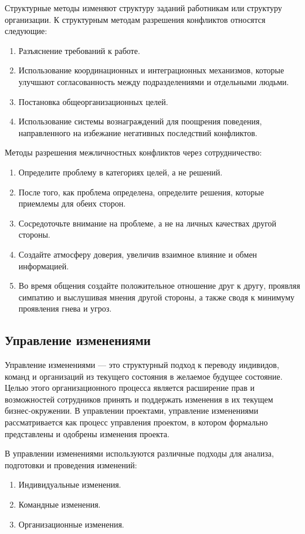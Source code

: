 \documentclass[a4paper,12pt,oneside,final]{extarticle}
\numberwithin{equation}{section}
\begin{document}
\begin{enumerate}
Структурные методы изменяют структуру заданий работникам или структуру организации. К структурным методам разрешения конфликтов относятся следующие:
\begin{enumerate}
	\item Разъяснение требований к работе. 
	\item Использование координационных и интеграционных механизмов, которые улучшают согласованность между подразделениями и отдельными людьми.
	\item Постановка общеорганизационных целей.
	\item Использование системы вознаграждений для поощрения поведения, направленного на избежание негативных последствий конфликтов.
\end{enumerate}

Методы разрешения межличностных конфликтов через сотрудничество:
\begin{enumerate}
	\item Определите проблему в категориях целей, а не решений.
	\item После того, как проблема определена, определите решения, которые приемлемы для обеих сторон.
	\item Сосредоточьте внимание на проблеме, а не на личных качествах другой стороны.
	\item Создайте атмосферу доверия, увеличив взаимное влияние и обмен информацией.
	\item Во время общения создайте положительное отношение друг к другу, проявляя симпатию и выслушивая мнения другой стороны, а также сводя к минимуму проявления гнева и угроз.
\end{enumerate}

\subsection{Управление изменениями}
Управление изменениями --- это структурный подход к переводу индивидов, команд и организаций из текущего состояния в желаемое будущее состояние. 
Целью этого организационного процесса является расширение прав и возможностей сотрудников принять и поддержать изменения в их текущем бизнес-окружении. 
В управлении проектами, управление изменениями рассматривается как процесс управления проектом, в котором формально представлены и одобрены изменения проекта.

В управлении изменениями используются различные подходы для анализа, подготовки и проведения изменений:
\begin{enumerate}
	\item Индивидуальные изменения.
	\item Командные изменения.
	\item Организационные изменения.
\end{enumerate}


\end{enumerate}
\end{document}
